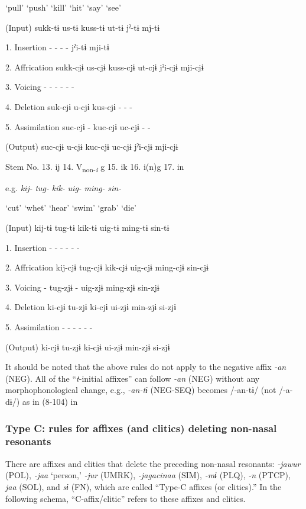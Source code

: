     ‘pull’  ‘push’  ‘kill’  ‘hit’  ‘say’  ‘see’

  (Input)  sukk-tɨ  us-tɨ  kuss-tɨ  ut-tɨ  jˀ-tɨ  mj-tɨ

1.  Insertion  {}-  {}-  {}-  {}-  jˀi-tɨ  mji-tɨ

2.  Affrication  sukk-cjɨ  us-cjɨ  kuss-cjɨ  ut-cjɨ  jˀi-cjɨ  mji-cjɨ

3.  Voicing  {}-  {}-  {}-  {}-  {}-  {}-

4.  Deletion  suk-cjɨ  u-cjɨ  kus-cjɨ  {}-  {}-  {}-

5.  Assimilation  suc-cjɨ  {}-  kuc-cjɨ  uc-cjɨ  {}-  {}-

  (Output)  suc-cjɨ  u-cjɨ  kuc-cjɨ  uc-cjɨ  jˀi-cjɨ  mji-cjɨ

  Stem No.  13. ij  14. V\textsubscript{non-}\textit{\textsubscript{i}} g  15. ik  16. i(n)g    17. in

  e.g.  \textit{kij-}  \textit{tug-}  \textit{kik-}  \textit{uig-}  \textit{ming-}  \textit{sin-}

    ‘cut’  ‘whet’  ‘hear’  ‘swim’  ‘grab’  ‘die’

  (Input)  kij-tɨ  tug-tɨ  kik-tɨ  uig-tɨ  ming-tɨ  sin-tɨ

1.  Insertion  {}-  {}-  {}-  {}-  {}-  {}-

2.  Affrication  kij-cjɨ  tug-cjɨ  kik-cjɨ  uig-cjɨ  ming-cjɨ  sin-cjɨ

3.  Voicing  {}-  tug-zjɨ  {}-  uig-zjɨ  ming-zjɨ  sin-zjɨ

4.  Deletion  ki-cjɨ  tu-zjɨ  ki-cjɨ  ui-zjɨ  min-zjɨ  si-zjɨ

5.  Assimilation  {}-  {}-  {}-  {}-  {}-  {}-

  (Output)  ki-cjɨ  tu-zjɨ  ki-cjɨ  ui-zjɨ  min-zjɨ  si-zjɨ

It should be noted that the above rules do not apply to the negative affix \textit{{}-an} (NEG). All of the “\textit{t}{}-initial affixes” can follow \textit{{}-an} (NEG) without any morphophonological change, e.g., \textit{{}-an-tɨ} (NEG-SEQ) becomes /-an-tɨ/ (not /-a-dɨ/) as in (8-104) in 

\subsubsection{Type C: rules for affixes (and clitics) deleting non-nasal resonants}
\label{bkm:Ref347177215}
There are affixes and clitics that delete the preceding non-nasal resonants: \textit{{}-jawur} (POL), \textit{{}-jaa} ‘person,’ \textit{{}-jur} (UMRK), \textit{{}-jagacinaa} (SIM), \textit{{}-mɨ} (PLQ), \textit{{}-n} (PTCP), \textit{jaa} (SOL), and \textit{sɨ} (FN), which are called “Type-C affixes (or clitics).” In the following schema, “C-affix/clitic” refers to these affixes and clitics.

